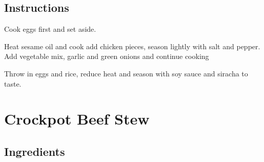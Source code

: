 \documentclass[ansiapaper,10pt,english]{sphinxmanual}
\begin{document}
\section{Instructions}
\label{\detokenize{Cluck_FR:instructions}}
Cook eggs first and set aside.

Heat sesame oil and cook add chicken pieces, season lightly with salt and pepper. Add vegetable mix, garlic and green onions and continue cooking

Throw in eggs and rice, reduce heat and season with soy sauce and siracha to taste.


\chapter{Crockpot Beef Stew}
\label{\detokenize{Crockpot_Beef_Stew:crockpot-beef-stew}}\label{\detokenize{Crockpot_Beef_Stew::doc}}

\section{Ingredients}
\label{\detokenize{Crockpot_Beef_Stew:ingredients}}
%
\begin{sphinxVerbatim}[commandchars=\\\{\}]
        

   

  

    

   

  

  

   

  

        

  

  

   
\end{sphinxVerbatim}
\end{document}
